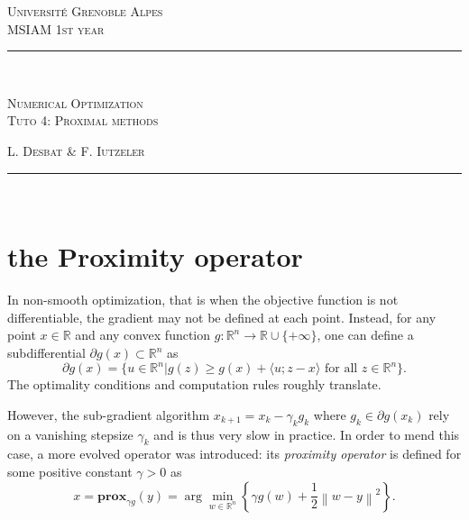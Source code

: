 \documentclass[a4paper,twoside,10pt]{amsart}
\numberwithin{equation}{section} %
\numberwithin{figure}{section} %
\numberwithin{table}{section} %
\newcommand{\horrule}[1]{\rule{\linewidth}{#1}} %
\theoremstyle{definition}
\begin{document}


\normalfont \normalsize 
\noindent\textsc{\small Universit\'e Grenoble Alpes }\\
\noindent\textsc{ MSIAM 1st year} \\ [0.3cm] %
\horrule{0.5pt} \\[0.4cm] %
\begin{center}
{\LARGE \scshape  Numerical Optimization \\
 Tuto 4: Proximal methods} \\ %
\end{center}
\noindent\textsc{\hfill L. Desbat \& F. Iutzeler } 
\horrule{2pt} \\[0.5cm] %



\setcounter{section}{0}
\renewcommand{\thesection}{\Alph{section}} 
\renewcommand*{\theHsection}{TD.\the\value{section}}


\vspace*{0.5cm}

\section{the Proximity operator}

In non-smooth optimization, that is when the objective function is not differentiable, the gradient may not be defined at each point. Instead, for any point $x\in\mathbb{R}$ and any convex function $g:\mathbb{R}^n \to \mathbb{R}\cup\{+\infty\}$, one can define a subdifferential $\partial g(x) \subset \mathbb{R}^n$ as 
$$ \partial g(x) = \{ u\in\mathbb{R}^n | g(z) \geq g(x) + \langle u ; z-x \rangle \text{ for all } z\in\mathbb{R}^n \}. $$
The optimality conditions and computation rules roughly translate.


However, the sub-gradient algorithm $x_{k+1} = x_k - \gamma_k g_k$ where $g_k\in \partial g(x_k)$ rely on a vanishing stepsize $\gamma_k$ and is thus very slow in practice. In order to mend this case, a more evolved operator was introduced: its \emph{proximity operator} is defined for some positive constant $\gamma>0$ as
\begin{equation}
x = \mathbf{prox}_{\gamma g}(y) = \arg\min_{w\in\mathbb{R}^n} \left\{ \gamma g(w)  + \frac{1}{2} \left\|  w - y \right\|^2  \right\}  .
\end{equation} 
\end{document}
